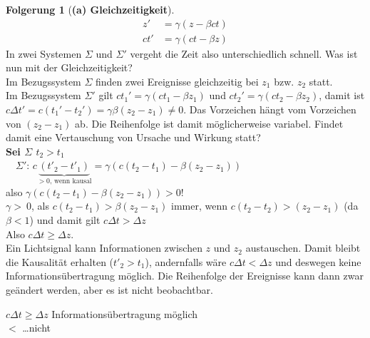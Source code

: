 \documentclass[oneside]{book}
\theoremstyle{definition}
\newtheorem*{folgerung*}{Folgerung}
\begin{document}
\begin{folgerung*}[\textbf{(a) Gleichzeitigkeit}]
	\begin{align*}
		z'  &= \gamma (z - \beta c t)\\
		ct' &= \gamma (ct - \beta z)
	\end{align*}
	In zwei Systemen $\Sigma$ und $\Sigma'$ vergeht die Zeit also unterschiedlich schnell. Was ist nun mit der Gleichzeitigkeit?\\
	Im Bezugssystem $\Sigma$ finden zwei Ereignisse gleichzeitig bei $z_1$ bzw. $z_2$ statt.\\
	Im Bezugssystem $\Sigma'$ gilt $ct_1' = \gamma (ct_1 - \beta z_1)$ und $ct_2' = \gamma (ct_2 - \beta z_2)$, damit ist $c \Delta t' = c(t_1'- t_2') = \gamma\beta (z_2 - z_1) \neq 0$.
	Das Vorzeichen hängt vom Vorzeichen von $(z_2 - z_1)$ ab. Die Reihenfolge ist damit möglicherweise variabel. Findet damit eine	Vertauschung von Ursache und Wirkung statt?\\
	\textbf{Sei $\Sigma$ $t_2 > t_1$}\\
	~~$\Sigma'$: $c\underbrace{(t'_2 - t'_1)}_{> 0 \text{, wenn kausal}} = \gamma (c (t_2 - t_1) - \beta (z_2 - z_1))$\\
	also $\gamma (c (t_2 - t_1) - \beta (z_2 - z_1)) > 0!$\\
		$\gamma >~0$, als $c (t_2 - t_1) > \beta (z_2 - z_1)$ immer, wenn $c(t_2 - t_2) > (z_2 - z_1)$ (da $\beta < 1$) und damit gilt $c \Delta t > \Delta z$\\
	Also $c \Delta t \geq \Delta z$.\\
		Ein Lichtsignal kann Informationen zwischen $z$ und $z_2$ austauschen. Damit bleibt die Kausalität erhalten ($t'_2 > t_1$), andernfalls wäre $c \Delta t < \Delta z$ und deswegen keine Informationsübertragung möglich. Die Reihenfolge der Ereignisse kann dann zwar geändert werden, aber es ist nicht beobachtbar.
\end{folgerung*}

$c \Delta t \geq \Delta z$ Informationsübertragung möglich\\
$<$ \dots nicht\\
\end{document}
